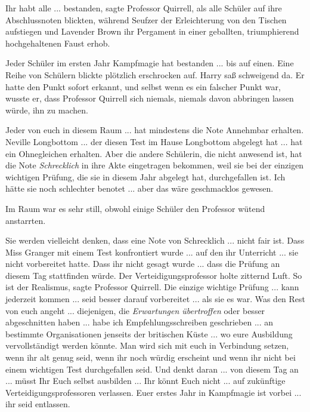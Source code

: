 \glqq{}Ihr habt alle ... bestanden\grqq{}, sagte Professor Quirrell, als alle
Schüler auf ihre Abschlussnoten blickten, während Seufzer der Erleichterung von
den Tischen aufstiegen und Lavender Brown ihr Pergament in einer geballten,
triumphierend hochgehaltenen Faust erhob.

\glqq{}Jeder Schüler im ersten Jahr Kampfmagie hat bestanden ... bis auf einen.\grqq{}
Eine Reihe von Schülern blickte plötzlich erschrocken auf. Harry saß schweigend
da. Er hatte den Punkt sofort erkannt, und selbst wenn es ein falscher Punkt
war, wusste er, dass Professor Quirrell sich niemals, niemals davon abbringen
lassen würde, ihn zu machen.

\glqq{}Jeder von euch in diesem Raum ... hat mindestens die Note Annehmbar
erhalten. Neville Longbottom ... der diesen Test im Hause Longbottom abgelegt
hat ... hat ein Ohnegleichen erhalten. Aber die andere Schülerin, die nicht
anwesend ist, hat die Note \glqq{}\emph{Schrecklich}\grqq{} in ihre Akte
eingetragen bekommen, weil sie bei der einzigen wichtigen Prüfung, die sie in
diesem Jahr abgelegt hat, durchgefallen ist. Ich hätte sie noch schlechter
benotet ... aber das wäre geschmacklos gewesen.\grqq{}

Im Raum war es sehr still, obwohl einige Schüler den Professor wütend
anstarrten.

\glqq{}Sie werden vielleicht denken, dass eine Note von Schrecklich ... nicht fair
ist. Dass Miss Granger mit einem Test konfrontiert wurde ... auf den ihr
Unterricht ... sie nicht vorbereitet hatte. Dass ihr nicht gesagt wurde ... dass
die Prüfung an diesem Tag stattfinden würde.\grqq{} Der Verteidigungsprofessor holte
zitternd Luft. \glqq{}So ist der Realismus\grqq{}, sagte Professor Quirrell.
\glqq{}Die einzige wichtige Prüfung ... kann jederzeit kommen ... seid besser
darauf vorbereitet ... als sie es war. Was den Rest von euch angeht ...
diejenigen, die \emph{Erwartungen übertroffen} oder besser abgeschnitten
haben ... habe ich Empfehlungsschreiben geschrieben ... an bestimmte
Organisationen jenseits der britischen Küste ... wo eure Ausbildung
vervollständigt werden könnte. Man wird sich mit euch in Verbindung setzen, wenn
ihr alt genug seid, wenn ihr noch würdig erscheint und wenn ihr nicht bei einem
wichtigen Test durchgefallen seid. Und denkt daran ... von diesem Tag an ...
müsst Ihr Euch selbst ausbilden ... Ihr könnt Euch nicht ... auf zukünftige
Verteidigungsprofessoren verlassen. Euer erstes Jahr in Kampfmagie ist vorbei ...
ihr seid entlassen.\grqq{}

